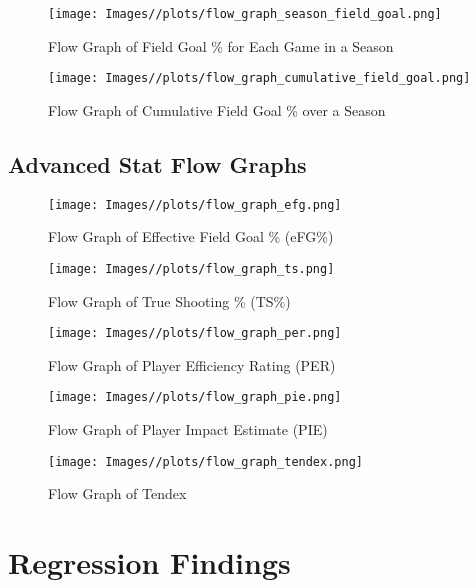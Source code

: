 \documentclass{article}
\begin{document}
\begin{figure}[H]
    \centering
    \texttt{[image: Images//plots/flow\_graph\_season\_field\_goal.png]}
    \caption{Flow Graph of Field Goal \% for Each Game in a Season}
    \label{fig:6}
\end{figure}

\begin{figure}[H]
    \centering
    \texttt{[image: Images//plots/flow\_graph\_cumulative\_field\_goal.png]}
    \caption{Flow Graph of Cumulative Field Goal \% over a Season}
    \label{fig:7}
\end{figure}

\subsection{Advanced Stat Flow Graphs}

\begin{figure}[H]
    \centering
    \texttt{[image: Images//plots/flow\_graph\_efg.png]}
    \caption{Flow Graph of Effective Field Goal \% (eFG\%)}
    \label{fig:enter-label}
\end{figure}

\begin{figure}[H]
    \centering
    \texttt{[image: Images//plots/flow\_graph\_ts.png]}
    \caption{Flow Graph of True Shooting \% (TS\%)}
    \label{fig:9}
\end{figure}

\begin{figure}[H]
    \centering
    \texttt{[image: Images//plots/flow\_graph\_per.png]}
    \caption{Flow Graph of Player Efficiency Rating (PER)}
    \label{fig:10}
\end{figure}

\begin{figure}[H]
    \centering
    \texttt{[image: Images//plots/flow\_graph\_pie.png]}
    \caption{Flow Graph of Player Impact Estimate (PIE)}
    \label{fig:11}
\end{figure}

\begin{figure}[H]
    \centering
    \texttt{[image: Images//plots/flow\_graph\_tendex.png]}
    \caption{Flow Graph of Tendex}
    \label{fig:12}
\end{figure}
\newpage
\section{Regression Findings}
\end{document}
